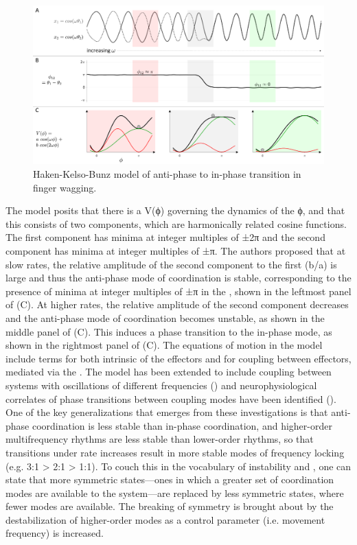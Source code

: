   
\begin{figure}
\includegraphics[width=\textwidth]{figures/Tilsen-img167.png}
\caption{Haken-Kelso-Bunz model of anti-phase to in-phase transition in finger wagging.}
\label{fig:8:1}
\end{figure}
 

  The \citet{HakenEtAl1985} model posits that there is a  V(ϕ) governing the dynamics of the  ϕ, and that this  consists of two components, which are harmonically related cosine functions. The first component has minima at integer multiples of ±2π and the second component has minima at integer multiples of ±π. The authors proposed that at slow rates, the relative amplitude of the second component to the first (b/a) is large and thus the anti-phase mode of coordination is stable, corresponding to the presence of minima at integer multiples of ±π in the , shown in the leftmost panel of {}(C). At higher rates, the relative amplitude of the second component decreases and the anti-phase mode of coordination becomes unstable, as shown in the middle panel of (C). This induces a phase transition to the in-phase mode, as shown in the rightmost panel of (C). The equations of motion in the model include terms for both intrinsic  of the effectors and for coupling between effectors, mediated via the . The model has been extended to include coupling between systems with oscillations of different frequencies (\citealt{Haken1996,Kelso1991,PeperEtAl1995,SternadEtAl1999}) and neurophysiological correlates of phase transitions between coupling modes have been identified  (\citealt{JantzenKelso2007,JantzenEtAl2008}). One of the key generalizations that emerges from these investigations is that anti-phase coordination is less stable than in-phase coordination, and higher-order multifrequency rhythms are less stable than lower-order rhythms, so that transitions under rate increases result in more stable modes of frequency locking (e.g. 3:1 > 2:1 > 1:1). To couch this in the vocabulary of instability and , one can state that more symmetric states—ones in which a greater set of coordination modes are available to the system—are replaced by less symmetric states, where fewer modes are available. The breaking of symmetry is brought about by the destabilization of higher-order modes as a control parameter (i.e. movement frequency) is increased.

